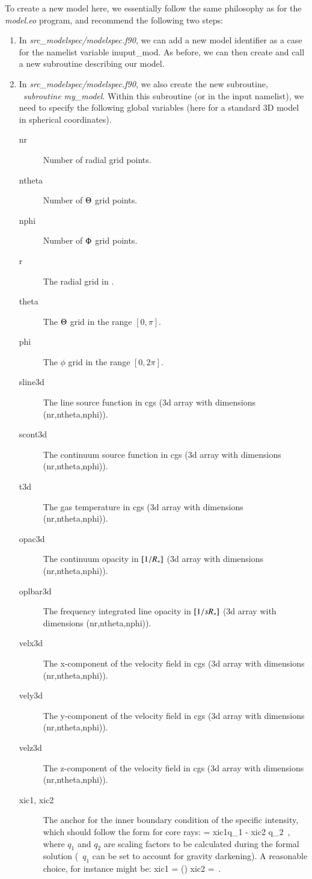 \documentclass[10pt,a4paper]{article}
\begin{document}
To create a new model here, we essentially follow the same philosophy
as for the \textit{model.eo} program, and recommend the following two steps:
\begin{enumerate}
\item In \textit{src\_modelspec/modelspec.f90}, we can add a new model identifier as a case for the namelist variable inuput\_mod.
  As before, we can then create and call a new subroutine describing our model.
  \item In \textit{src\_modelspec/modelspec.f90}, we also create the
    new subroutine, \eg~\textit{subroutine my\_model}. Within this
    subroutine (or in the input namelist), we need to specify the following global variables (here for a
    standard 3D model in spherical coordinates).
    \begin{description}
    \item[nr] Number of radial grid points.
    \item[ntheta] Number of $\Theta$ grid points.
    \item[nphi] Number of $\Phi$ grid points.
    \item[r] The radial grid in \Rstar.
    \item[theta] The $\Theta$ grid in the range $[0,\pi]$.
    \item[phi] The $\phi$ grid in the range $[0,2\pi]$.
    \item[sline3d] The line source function in cgs (3d array with dimensions (nr,ntheta,nphi)).
    \item[scont3d] The continuum source function in cgs (3d array with dimensions (nr,ntheta,nphi)).
    \item[t3d] The gas temperature in cgs (3d array with dimensions (nr,ntheta,nphi)).
    \item[opac3d] The continuum opacity in $[1/R_{\ast}]$ (3d array with dimensions (nr,ntheta,nphi)).
    \item[oplbar3d] The frequency integrated line opacity in $[1/sR_{\ast}]$ (3d array with dimensions (nr,ntheta,nphi)).
    \item[velx3d] The x-component of the velocity field in cgs (3d array with dimensions (nr,ntheta,nphi)).
    \item[vely3d] The y-component of the velocity field in cgs (3d array with dimensions (nr,ntheta,nphi)).
    \item[velz3d] The z-component of the velocity field in cgs (3d array with dimensions (nr,ntheta,nphi)).
    \item[xic1, xic2] The anchor for the inner boundary condition of the specific intensity, which should follow the form for core rays:
      \beq
      \Inu = xic1\cdot q_1 - xic2 \cdot q_2 \,,
      \eeq
      where $q_1$ and $q_2$ are scaling factors to be calculated during the formal solution (\eg~$q_1$ can be set to account for gravity darkening). A reasonable choice, for instance might be:
      \beq
      xic1 = \Bnu\left(\Teff\right) \qquad \qquad xic2 =  \,.
      \eeq
      \end{description}
  \end{enumerate}
\end{document}
